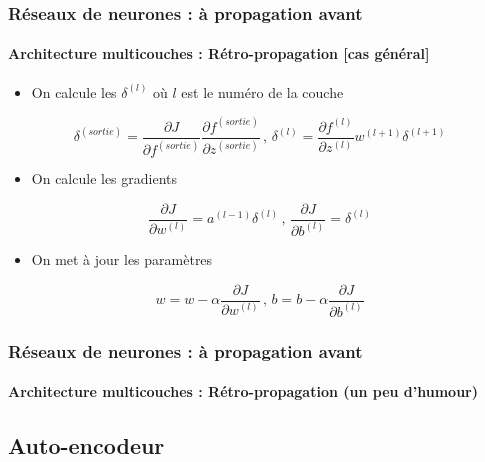 \documentclass[xcolor=table]{beamer}
\begin{document}
\begin{frame}
\frametitle{Réseaux de neurones : à propagation avant}
\framesubtitle{Architecture multicouches : Rétro-propagation [cas général]}

\begin{itemize}
	\item On calcule les $\delta^{(l)}$ où $l$ est le numéro de la couche
\end{itemize}

\[ 
\delta^{(sortie)} = 
\frac{\partial J}{\partial f^{(sortie)}} \frac{\partial f^{(sortie)}}{\partial z^{(sortie)}}
\,,\,
\delta^{(l)} = \frac{\partial f^{(l)}}{\partial z^{(l)}} w^{(l+1)} \delta^{(l+1)}
\]

\begin{itemize}
	\item On calcule les gradients
\end{itemize}

\[ 
\frac{\partial J}{\partial w^{(l)}} = a^{(l-1)} \delta^{(l)}
\,,\,
\frac{\partial J}{\partial b^{(l)}} = \delta^{(l)}
\]

\begin{itemize}
	\item On met à jour les paramètres
\end{itemize}

\[ 
w = w - \alpha \frac{\partial J}{\partial w^{(l)}}
\,,\,
b = b - \alpha \frac{\partial J}{\partial b^{(l)}}
\]


\end{frame}

\begin{frame}
\frametitle{Réseaux de neurones : à propagation avant}
\framesubtitle{Architecture multicouches : Rétro-propagation (un peu d'humour)}



\end{frame}

\subsection{Auto-encodeur}
\end{document}
